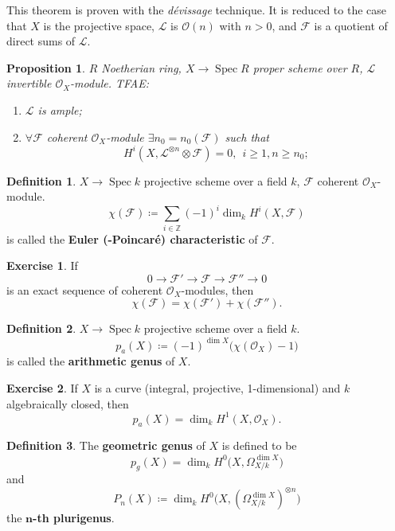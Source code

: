 \documentclass[12pt]{article}
\DeclareMathOperator{\Spec}{Spec}
\newtheorem*{proposition}{Proposition}
\theoremstyle{definition}
\newtheorem*{definition}{Definition}
\newtheorem*{exercise}{Exercise}
\begin{document}
This theorem is proven with the \emph{d\'evissage} technique. It is reduced to the case that $X$ is the projective space, $\mathcal L$ is $\mathcal O(n)$ with $n>0$, and $\mathcal F$ is a quotient of direct sums of $\mathcal L$.

\begin{proposition}
$R$ Noetherian ring, $X\rightarrow\Spec R$ proper scheme over $R$, $\mathcal L$ invertible $\mathcal O_X$-module. TFAE:
\begin{enumerate}[label=\arabic*)]
\item $\mathcal L$ is ample;
\item $\forall \mathcal F$ coherent $\mathcal O_X$-module $\exists n_0=n_0(\mathcal F)$ such that
\[H^i(X,\mathcal L^{\otimes n}\otimes\mathcal F)=0,\ \ i\geq1,n\geq n_0;\]
\end{enumerate}
\end{proposition}

\begin{definition}
$X\rightarrow\Spec k$ projective scheme over a field $k$, $\mathcal F$ coherent $\mathcal O_X$-module.
\[\chi(\mathcal F)\coloneqq\sum_{i\in\mathbb Z}(-1)^i\dim_kH^i(X,\mathcal F)\]
is called the \textbf{Euler (-Poincar\'e) characteristic} of $\mathcal F$.
\end{definition}

\begin{exercise}
If
\[0\longrightarrow\mathcal F'\longrightarrow\mathcal F\longrightarrow\mathcal F''\longrightarrow0\]
is an exact sequence of coherent $\mathcal O_X$-modules, then
\[\chi(\mathcal F)=\chi(\mathcal F')+\chi(\mathcal F'').\]
\end{exercise}

\begin{definition}
$X\rightarrow\Spec k$ projective scheme over a field $k$.
\[p_a(X)\coloneqq(-1)^{\dim X}\big(\chi(\mathcal O_X)-1\big)\]
is called the \textbf{arithmetic genus} of $X$.
\end{definition}

\begin{exercise}
If $X$ is a curve (integral, projective, 1-dimensional) and $k$ algebraically closed, then
\[p_a(X)=\dim_kH^1(X,\mathcal O_X).\]
\end{exercise}

\begin{definition}
The \textbf{geometric genus} of $X$ is defined to be
\[p_g(X)=\dim_kH^0\big(X,\Omega_{X/k}^{\dim X}\big)\]
and
\[P_n(X)\coloneqq\dim_kH^0(X,(\Omega_{X/k}^{\dim X})^{\otimes n}\big)\]
the $\boldsymbol n$\textbf{-th plurigenus}.
\end{definition}
\end{document}
